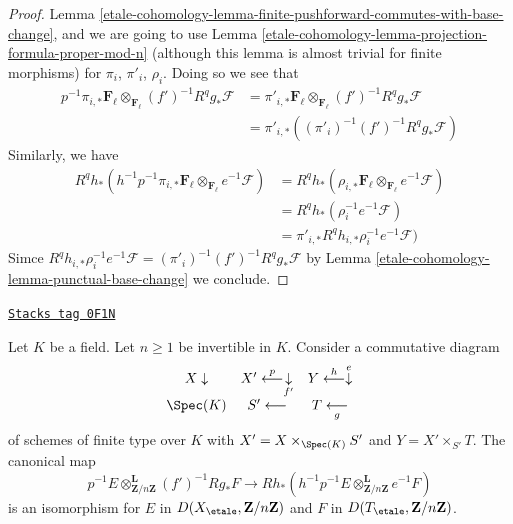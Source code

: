 \begin{proof}
Lemma \ref{etale-cohomology-lemma-finite-pushforward-commutes-with-base-change}, and
we are going to use
Lemma \ref{etale-cohomology-lemma-projection-formula-proper-mod-n}
(although this lemma is almost trivial for finite morphisms) for
$\pi_i$, $\pi'_i$, $\rho_i$.
Doing so we see that
\begin{align*}
p^{-1}\pi_{i, *}\mathbf{F}_\ell
\otimes_{\mathbf{F}_\ell} (f')^{-1}R^qg_*\mathcal{F}
& =
\pi'_{i, *}\mathbf{F}_\ell
\otimes_{\mathbf{F}_\ell} (f')^{-1}R^qg_*\mathcal{F} \\
& =
\pi'_{i, *}((\pi'_i)^{-1} (f')^{-1}R^qg_*\mathcal{F})
\end{align*}
Similarly, we have
\begin{align*}
R^qh_*(h^{-1}p^{-1} \pi_{i, *}\mathbf{F}_\ell
\otimes_{\mathbf{F}_\ell} e^{-1}\mathcal{F})
& =
R^qh_*(\rho_{i, *}\mathbf{F}_\ell
\otimes_{\mathbf{F}_\ell} e^{-1}\mathcal{F}) \\
& =
R^qh_*(\rho_i^{-1}e^{-1}\mathcal{F}) \\
& =
\pi'_{i, *}R^qh_{i, *} \rho_i^{-1}e^{-1}\mathcal{F})
\end{align*}
Simce
$R^qh_{i, *} \rho_i^{-1}e^{-1}\mathcal{F} =
(\pi'_i)^{-1} (f')^{-1}R^qg_*\mathcal{F}$ by
Lemma \ref{etale-cohomology-lemma-punctual-base-change}
we conclude.
\end{proof}

\begin{lemma}
\label{etale-cohomology-lemma-punctual-base-change-upgrade-unbounded}
\href{https://stacks.math.columbia.edu/tag/0F1N}{\texttt{Stacks tag 0F1N}}

Let $K$ be a field. Let $n \geq 1$ be invertible in $K$.
Consider a commutative diagram
$$
\begin{array}{ccc}X \downarrow & X' \overset{p}{\longleftarrow}\underset{f'}{\downarrow} & Y \overset{h}{\longleftarrow}\overset{e}{\downarrow} \\ \Spec(K) & S' \longleftarrow & T \underset{g}{\longleftarrow}\end{array}
$$
of schemes of finite type over $K$ with
$X' = X \times_{\Spec(K)} S'$ and $Y = X' \times_{S'} T$.
The canonical map
$$
p^{-1}E \otimes_{\mathbf{Z}/n\mathbf{Z}}^\mathbf{L} (f')^{-1}Rg_*F
\longrightarrow
Rh_*(h^{-1}p^{-1}E \otimes_{\mathbf{Z}/n\mathbf{Z}}^\mathbf{L} e^{-1}F)
$$
is an isomorphism for $E$ in $D(X_\etale, \mathbf{Z}/n\mathbf{Z})$
and $F$ in $D(T_\etale, \mathbf{Z}/n\mathbf{Z})$.
\end{lemma}

